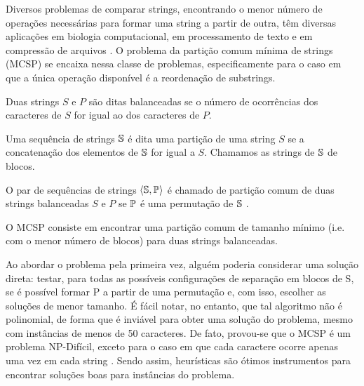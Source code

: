 Diversos problemas de comparar strings, encontrando o menor número de operações necessárias para formar uma string a partir de outra, têm diversas aplicações em biologia computacional, em processamento de texto e em compressão de arquivos \cite{goldstein_minimum_2005}. O problema da partição comum mínima de strings (MCSP) se encaixa nessa classe de problemas, especificamente para o caso em que a única operação disponível é a reordenação de substrings. 

\begin{definition}
    Duas strings $S$ e $P$ são ditas balanceadas se o número de ocorrências dos caracteres de $S$ for igual ao dos caracteres de $P$.
\end{definition}

\begin{definition}[Partição]
    Uma sequência de strings $\S$ é dita uma partição de uma string $S$ se a concatenação dos elementos de $\S$ for igual a $S$. Chamamos as strings de $\S$ de blocos.
\end{definition}

\begin{definition}
    O par de sequências de strings $\left\langle \S, \P \right\rangle$ é chamado de partição comum de duas strings balanceadas $S$ e $P$ se $\P$ é uma permutação de $\S$ \cite{goldstein_minimum_2005}.
\end{definition}





O MCSP consiste em encontrar uma partição comum de tamanho mínimo (i.e. com o menor número de blocos) para duas strings balanceadas.

Ao abordar o problema pela primeira vez, alguém poderia considerar uma solução direta: testar, para todas as possíveis configurações de separação em blocos de S, se é possível formar P a partir de uma permutação e, com isso, escolher as soluções de menor tamanho. É fácil notar, no entanto, que tal algoritmo não é polinomial, de forma que é inviável para obter uma solução do problema, mesmo com instâncias de menos de 50 caracteres. De fato, provou-se que o MCSP é um problema NP-Difícil, exceto para o caso em que cada caractere ocorre apenas uma vez em cada string \cite{goldstein_minimum_2005}. Sendo assim, heurísticas são ótimos instrumentos para encontrar soluções boas para instâncias do problema.

